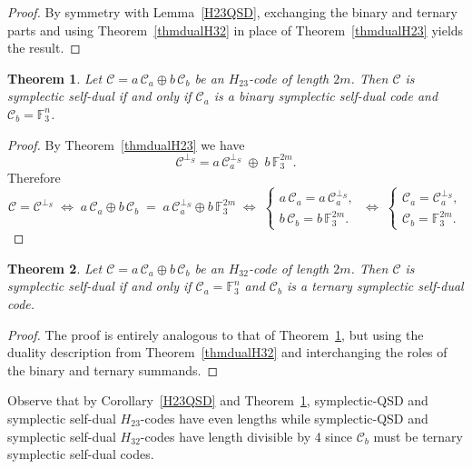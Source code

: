 \documentclass[11pt,a4paper]{article}
\newtheorem{theorem}{Theorem}[section]
\theoremstyle{definition}
\numberwithin{equation}{section}
\def\C{{\mathcal{C}}}
\begin{document}
\begin{proof}
By symmetry with Lemma~\ref{H23QSD}, exchanging the binary and ternary parts and using Theorem~\ref{thmdualH32} in place of Theorem~\ref{thmdualH23} yields the result.
\end{proof}


\begin{theorem}\label{SD}
Let $\C=a\, \C_a \oplus b\, \C_b$ be an $H_{23}$-code of length $2m$. Then  $\C$ is symplectic self-dual if and only if  $\C_a$ is a binary symplectic self-dual  code and $\C_b=\mathbb{F}_3^n$.
\end{theorem}
\begin{proof}
By Theorem~\ref{thmdualH23} we have
\[
\C^{\perp_S}
= a\,\C_a^{\perp_S}\;\oplus\;b\,\mathbb{F}_3^{2m}.
\]
Therefore
\[
\C = \C^{\perp_S}
\;\Longleftrightarrow\;
a\,\C_a\oplus b\,\C_b
\;=\;
a\,\C_a^{\perp_S}\oplus b\,\mathbb{F}_3^{2m}
\;\Longleftrightarrow\;
\begin{cases}
a\,\C_a = a\,\C_a^{\perp_S},\\
b\,\C_b = b\,\mathbb{F}_3^{2m}.
\end{cases}
\;\Longleftrightarrow\;
\begin{cases}
\C_a = \C_a^{\perp_S},\\
\C_b = \mathbb{F}_3^{2m}.
\end{cases}
\]

\end{proof}

\begin{theorem}\label{SD2}
Let $\C=a\, \C_a \oplus b\, \C_b$ be an $H_{32}$-code of length $2m$. Then  $\C$ is symplectic self-dual if and only if  $\C_a=\mathbb{F}_3^n$ and  $\C_b$ is a ternary symplectic self-dual code.
\end{theorem}

\begin{proof}
The proof is entirely analogous to that of Theorem~\ref{SD}, but using the duality description from Theorem~\ref{thmdualH32} and interchanging the roles of the binary and ternary summands.
\end{proof}
\bigskip
Observe that by Corollary~\ref{H23QSD} and Theorem~\ref{SD},  symplectic-QSD and symplectic self-dual $H_{23}$-codes have even lengths while symplectic-QSD and symplectic self-dual $H_{32}$-codes have length divisible by 4 since $\C_b$ must be ternary symplectic self-dual codes.
\end{document}
